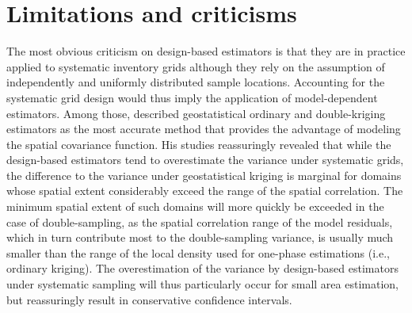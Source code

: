 

\section{Limitations and criticisms}
\label{sec:synth:limits}

The most obvious criticism on design-based estimators is that they are in practice applied to systematic inventory grids although they rely on the assumption of independently and uniformly distributed sample locations. Accounting for the systematic grid design would thus imply the application of model-dependent estimators. Among those, \citet{mandallaz1993} described geostatistical ordinary and double-kriging estimators as the most accurate method that provides the advantage of modeling the spatial covariance function. His studies reassuringly revealed that while the design-based estimators tend to overestimate the variance under systematic grids, the difference to the variance under geostatistical kriging is marginal for domains whose spatial extent considerably exceed the range of the spatial correlation. The minimum spatial extent of such domains will more quickly be exceeded in the case of double-sampling, as the spatial correlation range of the model residuals, which in turn contribute most to the double-sampling variance, is usually much smaller than the range of the local density used for one-phase estimations (i.e., ordinary kriging). The overestimation of the variance by design-based estimators under systematic sampling will thus particularly occur for small area estimation, but reassuringly result in conservative confidence intervals.\par

